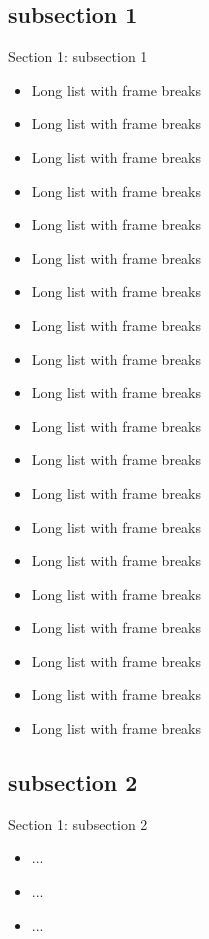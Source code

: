 \documentclass{beamer}
\begin{document}
\subsection{subsection 1}
\begin{frame}[allowframebreaks]{Section 1: subsection 1}
\begin{itemize}
	\item Long list with frame breaks 
	\item Long list with frame breaks 
	\item Long list with frame breaks 
	\item Long list with frame breaks 
	\item Long list with frame breaks 
	\item Long list with frame breaks 
	\item Long list with frame breaks 
	\item Long list with frame breaks 
	\item Long list with frame breaks 
	\item Long list with frame breaks 
	\item Long list with frame breaks 
	\item Long list with frame breaks 
	\item Long list with frame breaks 
	\item Long list with frame breaks 
	\item Long list with frame breaks 
	\item Long list with frame breaks 
	\item Long list with frame breaks 
	\item Long list with frame breaks 
	\item Long list with frame breaks 
	\item Long list with frame breaks 
\end{itemize}
\end{frame}
\subsection{subsection 2}
\begin{frame}{Section 1: subsection 2}
\begin{itemize}
	\item ...
	\item ...
	\item ...
\end{itemize}
\end{frame}
\end{document}
